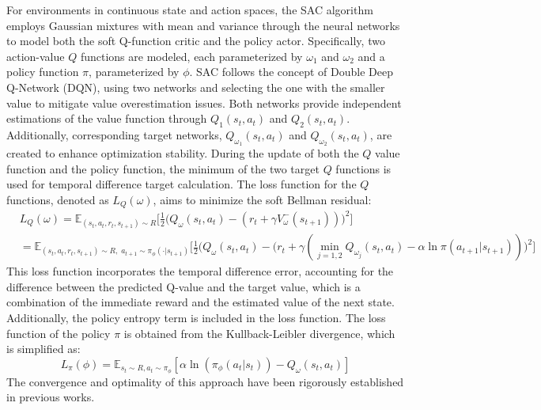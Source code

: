 For environments in continuous state and action spaces, the SAC algorithm employs Gaussian mixtures with mean and variance through the neural networks to model both the soft Q-function critic and the policy actor. Specifically, two action-value $Q$ functions are modeled, each parameterized by $\omega_1$ and $\omega_2$ and a policy function $\pi$, parameterized by $\phi$. SAC follows the concept of Double Deep Q-Network (DQN), using two networks and selecting the one with the smaller value to mitigate value overestimation issues. Both networks provide independent estimations of the value function through $Q_1(s_t, a_t)$ and $Q_2(s_t, a_t)$. Additionally, corresponding target networks, $Q_{\omega_1}(s_t, a_t)$ and $Q_{\omega_2}(s_t, a_t)$, are created to enhance optimization stability. During the update of both the $Q$ value function and the policy function, the minimum of the two target $Q$ functions is used for temporal difference target calculation. The loss function for the $Q$ functions, denoted as $L_Q(\omega)$, aims to minimize the soft Bellman residual: 
\begin{equation}
    \begin{aligned}
    &L_Q(\omega) = \mathbb{E}_{(s_t, a_t, r_t, s_{t+1}) \sim R}\bigg[\frac{1}{2}\bigg(Q_\omega(s_t,a_t)-(r_t+\gamma V_\omega^- (s_{t+1}))\bigg)^2\bigg]\\
    &=\mathbb{E}_{(s_t, a_t, r_t, s_{t+1}) \sim R,\;a_{t+1} \sim \pi_\phi(\cdot|s_{t+1})}\bigg[\frac{1}{2}\bigg(Q_\omega(s_t,a_t)-(r_t+\gamma(\min_{j=1,2}Q_{\omega_j}(s_t,a_t)-\alpha\ln\pi(a_{t+1}|s_{t+1}))\bigg)^2\bigg]
    \end{aligned}
    \label{eq:lossSAC}
\end{equation}
This loss function incorporates the temporal difference error, accounting for the difference between the predicted Q-value and the target value, which is a combination of the immediate reward and the estimated value of the next state. Additionally, the policy entropy term is included in the loss function. The loss function of the policy $\pi$ is obtained from the Kullback-Leibler divergence, which is simplified as: $$L_\pi(\phi)=\mathbb{E}_{s_t\sim R,a_t\sim \pi_\phi}[\alpha\ln(\pi_\phi(a_t|s_t))-Q_\omega(s_t,a_t)]$$The convergence and optimality of this approach have been rigorously established in previous works\cite{haarnojaSoftActorCriticAlgorithms2019, haarnojaSoftActorCriticOffPolicy2018}. 

